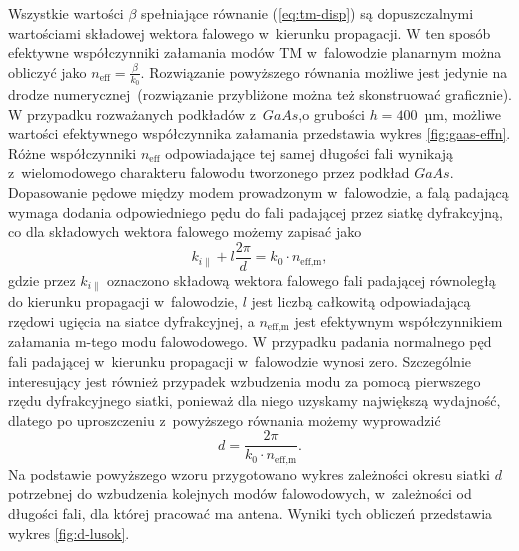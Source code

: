Wszystkie wartości $\beta$ spełniające  równanie (\ref{eq:tm-disp}) są dopuszczalnymi wartościami składowej wektora falowego w~kierunku propagacji. W ten sposób efektywne współczynniki załamania modów TM w~falowodzie planarnym można obliczyć jako $n_{\textrm{eff}}=\frac{\beta}{k_0}$. Rozwiązanie powyższego równania możliwe jest jedynie na drodze numerycznej~(rozwiązanie przybliżone można też skonstruować graficznie). W przypadku rozważanych podkładów z~$GaAs$,o grubości $h=400$~µm, możliwe wartości efektywnego współczynnika załamania przedstawia wykres \ref{fig:gaas-effn}. Różne współczynniki $n_{\textrm{eff}}$ odpowiadające tej samej długości fali wynikają z~wielomodowego charakteru falowodu tworzonego przez podkład $GaAs$. Dopasowanie pędowe między modem prowadzonym w~falowodzie, a falą padającą wymaga dodania odpowiedniego pędu do fali padającej przez siatkę dyfrakcyjną, co dla składowych wektora falowego możemy zapisać jako
\begin{equation}
k_{i \parallel} + l \frac{2\pi}{d} = k_0 \cdot n_{\textrm{eff,m}} , 
\end{equation}
gdzie przez $k_{i \parallel}$ oznaczono składową wektora falowego fali padającej równoległą do kierunku propagacji w~falowodzie, $l$ jest liczbą całkowitą odpowiadającą rzędowi ugięcia na siatce dyfrakcyjnej, a $n_{\textrm{eff,m}}$ jest efektywnym współczynnikiem załamania m-tego modu falowodowego. W przypadku padania normalnego pęd fali padającej w~kierunku propagacji w~falowodzie wynosi zero. Szczególnie interesujący jest również przypadek wzbudzenia modu za pomocą pierwszego rzędu dyfrakcyjnego siatki, ponieważ dla niego uzyskamy największą wydajność, dlatego po uproszczeniu z~powyższego równania możemy wyprowadzić
\begin{equation}
d=\frac{2 \pi}{k_0 \cdot n_{\textrm{eff,m}}}.
\label{eq:d-do-wzbudzenia}
\end{equation}
Na podstawie powyższego wzoru przygotowano wykres zależności okresu siatki $d$ potrzebnej do wzbudzenia kolejnych modów falowodowych, w~zależności od długości fali, dla której pracować ma antena. Wyniki tych obliczeń przedstawia wykres \ref{fig:d-lusok}.

